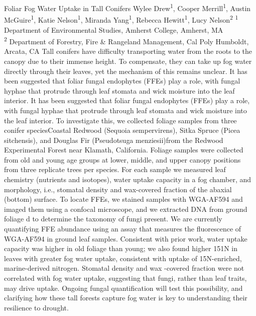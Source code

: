 \makeabstract
    {
    Foliar Fog Water Uptake in Tall Conifers
    }
    {
     Wylee Drew\textsuperscript{1}, Cooper Merrill\textsuperscript{1}, Austin McGuire\textsuperscript{1}, Katie Nelson\textsuperscript{1}, Miranda Yang\textsuperscript{1}, Rebecca Hewitt\textsuperscript{1}, Lucy Nelson\textsuperscript{2}
    }
    {
    \textsuperscript{1} Department of Environmental Studies, Amherst College, Amherst, MA\\
\textsuperscript{2} Department of Forestry, Fire \& Rangeland Management, Cal Poly Humboldt, Arcata, CA
    }
    {
    Tall conifers have difficulty transporting water from the roots to the canopy due to their immense height. To compensate, they can take up fog water directly through their leaves, yet the mechanism of this remains unclear. It has been suggested that foliar fungal endophytes (FFEs) play a role, with fungal hyphae that protrude through leaf stomata and wick moisture into the leaf interior.
    }
    {
    It has been suggested that foliar fungal endophytes (FFEs) play a role, with fungal hyphae that protrude through leaf stomata and wick moisture into the leaf interior. To investigate this, we collected foliage samples from three conifer species{\textendash}Coastal Redwood (Sequoia sempervirens), Sitka Spruce (Picea sitchensis), and Douglas Fir (Pseudotsuga menziesii){\textendash}from the Redwood Experimental Forest near Klamath, California. Foliage samples were collected from old and young age groups at lower, middle, and upper canopy positions from three replicate trees per species. For each sample we measured leaf chemistry (nutrients and isotopes), water uptake capacity in a fog chamber, and morphology, i.e.,  stomatal density and wax-covered fraction of the abaxial (bottom) surface. To locate FFEs, we   stained samples with WGA-AF594 and imaged them using a confocal microscope, and we extracted DNA from ground foliage d to determine the taxonomy of fungi present. We are currently quantifying FFE abundance using an assay that measures the fluorescence of WGA-AF594 in ground leaf samples. 
    }
    {
     Consistent with prior work, water uptake capacity was higher in old foliage than young; we also found higher 151N in leaves with greater fog water uptake, consistent with uptake of 15N-enriched, marine-derived nitrogen. Stomatal density and wax -covered fraction were not correlated with fog water uptake, suggesting that fungi, rather than leaf traits, may drive uptake.
    }
    {
    Ongoing fungal quantification will test this possibility, and clarifying how these tall forests capture fog water is key to understanding their resilience to drought.
    }

    \newpage
    